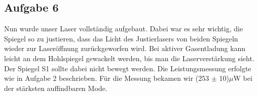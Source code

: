 \subsection{Aufgabe 6}

Nun wurde unser Laser vollständig aufgebaut. Dabei war es sehr wichtig, die Spiegel so zu justieren, dass das Licht des Justierlasers von beiden Spiegeln wieder zur Laseröffnung zurückgeworfen wird. Bei aktiver Gasentladung kann leicht an dem Hohlspiegel gewackelt werden, bis man die Laserverstärkung sieht. Der Spiegel S1 sollte dabei nicht bewegt werden. Die Leistungsmessung erfolgte wie in Aufgabe 2 beschrieben.
Für die Messung bekamen wir (253 $\pm$ 10)$\mu$W bei der stärksten auffindbaren Mode. 

